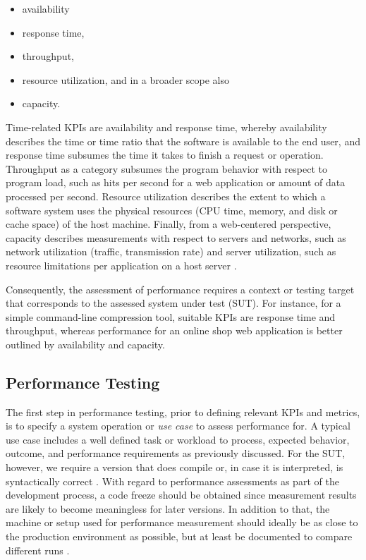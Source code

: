 \begin{itemize}
  \item availability
  \item response time,
  \item throughput,
  \item resource utilization, and in a broader scope also 
  \item capacity.
\end{itemize}

Time-related KPIs are availability and response time, whereby
availability describes the time or time ratio that the software is available to
the end user, and response time subsumes the time it takes to finish a request
or operation. Throughput as a category subsumes the program behavior with
respect to program load, such as hits per second for a web application or
amount of data processed per second. Resource utilization describes the extent
to which a software system uses the physical resources (CPU time, memory, and
disk or cache space) of the host machine. Finally, from a web-centered
perspective, capacity describes measurements with respect to servers and
networks, such as network utilization  (traffic, transmission rate) and server
utilization, such as resource limitations per application on a host server
\citep{molyneaux_art_2014}.

Consequently, the assessment of performance requires a context or testing
target that corresponds to the assessed system under test (SUT). For instance,
for a simple command-line compression tool, suitable KPIs are response time and
throughput, whereas performance for an online shop web application is better
outlined by availability and capacity.

\subsection{Performance Testing}
The first step in performance testing, prior to defining relevant KPIs and
metrics, is to specify a system operation or \emph{use case}
\citep{woodside_future_2007} to assess performance for. A typical use case includes a well defined task or
workload to process, expected behavior, outcome, and performance
requirements as previously discussed. For the SUT, however, we require a
version that does compile or, in case it is interpreted, is syntactically
correct \citep{molyneaux_art_2014}. With regard to performance assessments as part of
the development process, a code freeze should be obtained since measurement
results are likely to become meaningless for later versions. In addition to
that,  the machine or setup used for performance measurement should ideally be
as close to the production environment as possible, but at least be documented
to compare different runs \citep{molyneaux_art_2014}.

